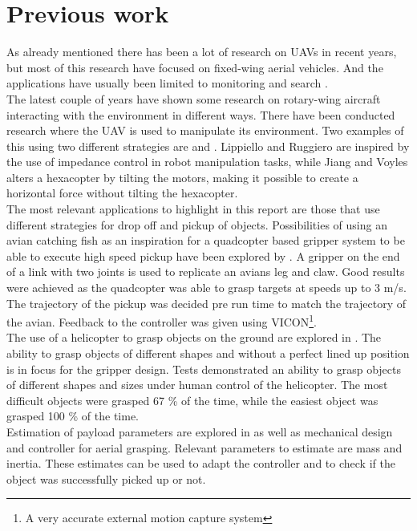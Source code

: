 \section{Previous work}
As already mentioned there has been a lot of research on UAVs in recent years, but most of this research have focused on fixed-wing aerial vehicles. And the applications have usually been limited to monitoring and search \citep{Mellinger2011}.\\
\newline
The latest couple of years have shown some research on rotary-wing aircraft interacting with the environment in different ways. There have been conducted research where the UAV is used to manipulate its environment. Two examples of this using two different strategies are \citep{jiang} and \citep{cartesian}. Lippiello and Ruggiero are inspired by the use of impedance control in robot manipulation tasks, while Jiang and Voyles alters a hexacopter by tilting the motors, making it possible to create a horizontal force without tilting the hexacopter.\\ 
\newline
The most relevant applications to highlight in this report are those that use different strategies for drop off and pickup of objects. Possibilities of using an avian catching fish as an inspiration for a quadcopter based gripper system to be able to execute high speed pickup have been explored by \citep{Thomas2013}. A gripper on the end of a link with two joints is used to replicate an avians leg and claw. Good results were achieved as the quadcopter was able to grasp targets at speeds up to 3 m/s. The trajectory of the pickup was decided pre run time to match the trajectory of the avian. Feedback to the controller was given using VICON\footnote{A very accurate external motion capture system}.\\
\newline
The use of a helicopter to grasp objects on the ground are explored in \citep{Pounds}. The ability to grasp objects of different shapes and without a perfect lined up position is in focus for the gripper design. Tests demonstrated an ability to grasp objects of different shapes and sizes under human control of the helicopter. The most difficult objects were grasped 67 \% of the time, while the easiest object was grasped 100 \% of the time.\\
\newline
Estimation of payload parameters are explored in \citep{Mellinger2011} as well as mechanical design and controller for aerial grasping. Relevant parameters to estimate are mass and inertia. These estimates can be used to adapt the controller and to check if the object was successfully picked up or not.
